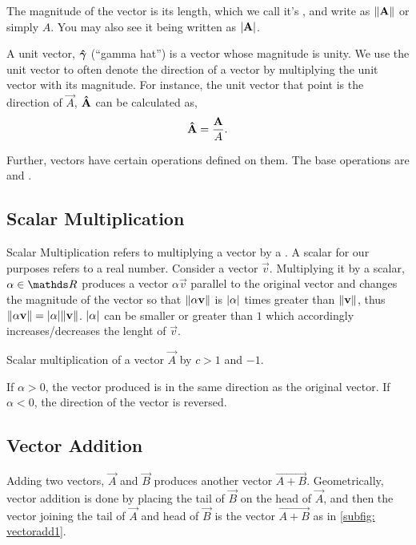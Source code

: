 The magnitude of the vector is its length, which we call it's , and write
as \(\norm{\mathbf{\boldsymbol{A}}}\) or simply \(A\). You may also see it being written as \(\abs{\mathbf{\boldsymbol{A}}}\).

A unit vector, \(\mathbf{\boldsymbol{\hat{\gamma}}}\) (“gamma hat”) is a vector whose magnitude is unity. We use the unit vector to
often denote the direction of a vector by multiplying the unit vector with its magnitude.
For instance, the unit vector that point is the direction of \(\vec{A}\), \(\mathbf{\boldsymbol{\hat{A}}}\) can be calculated as,
\[
\mathbf{\boldsymbol{\hat{A}}} = \frac{\mathbf{\boldsymbol{A}}}{A}.
\]

Further, vectors have certain operations defined on them. The base operations
are  and .

\subsection{Scalar Multiplication}  

Scalar Multiplication refers to multiplying a vector by a . A scalar
for our purposes refers to a real number. Consider a vector \(\vec{v}\).
Multiplying it by a scalar, \(\alpha \in \RR\) produces a vector 
\(\alpha\vec{v}\) parallel to the original vector and changes the magnitude of the vector so that
\(\norm{\alpha\mathbf{\boldsymbol{v}}}\) is \(\abs{\alpha}\) times greater than \(\norm{\mathbf{\boldsymbol{v}}}\), thus
\(\norm{\alpha \mathbf{\boldsymbol{v}}} = \abs{\alpha}\norm{\mathbf{\boldsymbol{v}}}\). \(\abs{\alpha}\) can 
be smaller or greater than \(1\) which accordingly increases/decreases the 
lenght of \(\vec{v}\).

\begin{marginfigure}
  \centering
  \caption{Scalar multiplication of a vector \(\vec{A}\) by \(c > 1\) and \(-1\).}
\end{marginfigure}

If \(\alpha > 0\), the vector produced is in the same direction as the original vector. If
\(\alpha < 0\), the direction of the vector is reversed. 

\subsection{Vector Addition}

Adding two vectors, \(\vec{A}\) and \(\vec{B}\) produces another 
vector \(\vec{A + B}\). Geometrically, vector addition is done by placing
the tail of \(\vec{B}\) on the head of \(\vec{A}\), and then the vector joining
the tail of \(\vec{A}\) and head of \(\vec{B}\) is the vector \(\vec{A + B}\) as 
in \cref{subfig: vectoradd1}.

